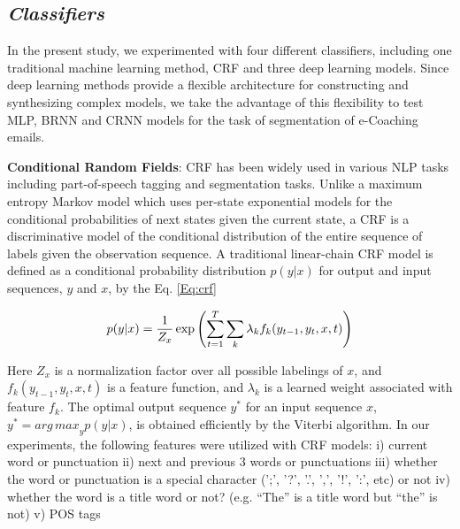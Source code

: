 \documentclass{amia}
\begin{document}
\subsection*{\textit{Classifiers}}

In the present study, we experimented with four different classifiers, including one traditional machine learning method, CRF and three deep learning models. Since deep learning methods provide a flexible architecture for constructing and synthesizing complex models, we take the advantage of this flexibility to test MLP, BRNN and CRNN models for the task of segmentation of e-Coaching emails.

\textbf{Conditional Random Fields}: CRF has been widely used in various NLP tasks including part-of-speech tagging and segmentation tasks.\cite{lafferty2001conditional, hirohata2008identifying} Unlike a maximum entropy Markov model which uses per-state exponential models for the conditional probabilities of next states given the current state, a CRF is a discriminative model of the conditional distribution of the entire sequence of labels given the observation sequence. A traditional linear-chain CRF model is defined as a conditional probability distribution $p(y|x)$ for output and input sequences, $y$ and $x$, by the Eq. \ref{Eq:crf}

\begin{equation}
\label{Eq:crf}
p(y|x) = \frac{1}{Z_x}\exp{\left(\sum_{t=1}^{T}\sum_{k}^{}\lambda_k f_k(y_{t-1}, y_t, x, t)\right)} \\
\end{equation}

Here $Z_x$ is a normalization factor over all possible labelings of $x$, and $f_k(y_{t-1}, y_t, x, t)$ is a feature function, and $\lambda_k$ is a learned weight associated with feature $f_k$. The optimal output sequence $y^*$ for an input sequence $x$, $y^* = {arg\,max}_y p(y|x)$, is obtained efficiently by the Viterbi algorithm. In our experiments, the following features were utilized with CRF models: i) current word or punctuation ii) next and previous 3 words or punctuations iii) whether the word or punctuation is a special character (';', '?', '.', ',', '!', ':', etc) or not iv) whether the word is a title word or not? (e.g. ``The'' is a title word but ``the'' is not) v) POS tags   
\end{document}
